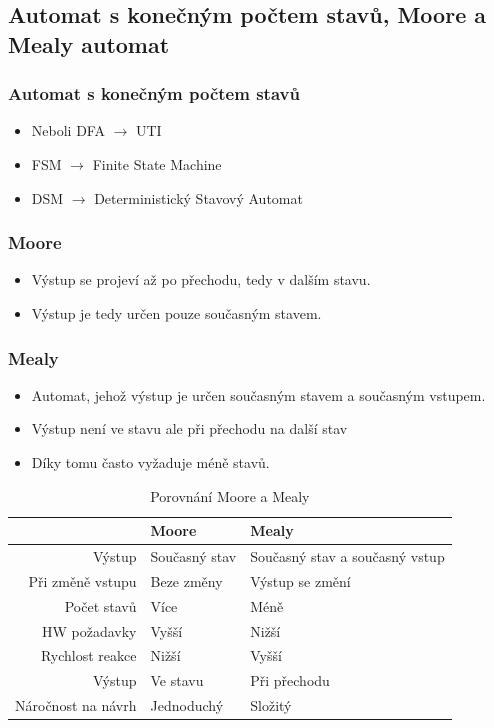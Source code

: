 \documentclass[10pt,a4paper]{article}
\begin{document}
\subsection{Automat s konečným počtem stavů, Moore a Mealy automat}
\subsubsection{Automat s konečným počtem stavů}
\begin{itemize}
\item Neboli DFA $\rightarrow$ UTI
\item FSM $\rightarrow$ Finite State Machine
\item DSM $\rightarrow$ Deterministický Stavový Automat
\end{itemize}

\subsubsection{Moore}
\begin{itemize}
\item Výstup se projeví až po přechodu, tedy v dalším stavu.
\item Výstup je tedy určen pouze současným stavem.
\end{itemize}

\subsubsection{Mealy}
\begin{itemize}
\item Automat, jehož výstup je určen současným stavem a současným vstupem. 
\item Výstup není ve stavu ale při přechodu na další stav
\item Díky tomu často vyžaduje méně stavů.
\end{itemize}
\begin{table}[ht]
\centering
\begin{tabular}{rll}
\hline
                   & Moore         & Mealy                          \\
                   \hline
Výstup             & Současný stav & Současný stav a současný vstup \\
Při změně vstupu   & Beze změny    & Výstup se změní                \\
Počet stavů        & Více          & Méně                           \\
HW požadavky       & Vyšší         & Nižší                          \\
Rychlost reakce    & Nižší         & Vyšší                          \\
Výstup             & Ve stavu      & Při přechodu                   \\
Náročnost na návrh & Jednoduchý    & Složitý             \\ \hline          
\end{tabular}
\caption{Porovnání Moore a Mealy}
\label{tab:fsm}
\end{table}
\end{document}
